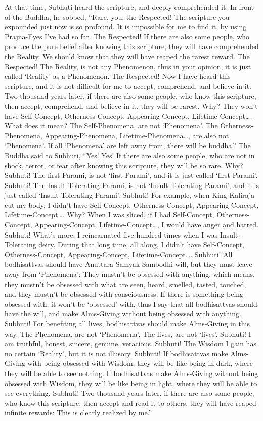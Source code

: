 \documentclass[a5paper,12pt]{book}
\begin{document}
     At that time, Subhuti heard the scripture, and deeply comprehended it. In front of the Buddha, he sobbed, ``Rare, you, the Respected! The scripture you expounded just now is so profound. It is impossible for me to find it, by using Prajna-Eyes I've had so far. The Respected! If there are also some people, who produce the pure belief after knowing this scripture, they will have comprehended the Reality. We should know that they will have reaped the rarest reward. The Respected! The Reality, is not any Phenomenon, thus in your opinion, it is just called `Reality' as a Phenomenon. The Respected! Now I have heard this scripture, and it is not difficult for me to accept, comprehend, and believe in it. Two thousand years later, if there are also some people, who know this scripture, then accept, comprehend, and believe in it, they will be rarest. Why? They won't have Self-Concept, Otherness-Concept, Appearing-Concept, Lifetime-Concept\dots{}. What does it mean? The Self-Phenomena, are not `Phenomena'. The Otherness-Phenomena, Appearing-Phenomena, Lifetime-Phenomena\dots{}, are also not `Phenomena'. If all `Phenomena' are left away from, there will be buddha.'' The Buddha said to Subhuti, ``Yes! Yes! If there are also some people, who are not in shock, terror, or fear after knowing this scripture, they will be so rare. Why? Subhuti! The first Parami, is not `first Parami', and it is just called `first Parami'. Subhuti! The Insult-Tolerating-Parami, is not `Insult-Tolerating-Parami', and it is just called `Insult-Tolerating-Parami'. Subhuti! For example, when King Kaliraja cut my body, I didn't have Self-Concept, Otherness-Concept, Appearing-Concept, Lifetime-Concept\dots{}. Why? When I was sliced, if I had Self-Concept, Otherness-Concept, Appearing-Concept, Lifetime-Concept\dots{}, I would have anger and hatred. Subhuti! What's more, I reincarnated five hundred times when I was Insult-Tolerating deity. During that long time, all along, I didn't have Self-Concept, Otherness-Concept, Appearing-Concept, Lifetime-Concept\dots{}. Subhuti! All bodhisattvas should have Anuttara-Samyak-Sambodhi will, but they must leave away from `Phenomena': They mustn't be obsessed with anything, which means, they mustn't be obsessed with what are seen, heard, smelled, tasted, touched, and they mustn't be obsessed with consciousness. If there is something being obsessed with, it won't be `obsessed' with, thus I say that all bodhisattvas should have the will, and make Alms-Giving without being obsessed with anything. Subhuti! For benefiting all lives, bodhisattvas should make Alms-Giving in this way. The Phenomena, are not `Phenomena'. The lives, are not `lives'. Subhuti! I am truthful, honest, sincere, genuine, veracious. Subhuti! The Wisdom I gain has no certain `Reality', but it is not illusory. Subhuti! If bodhisattvas make Alms-Giving with being obsessed with Wisdom, they will be like being in dark, where they will be able to see nothing. If bodhisattvas make Alms-Giving without being obsessed with Wisdom, they will be like being in light, where they will be able to see everything. Subhuti! Two thousand years later, if there are also some people, who know this scripture, then accept and read it to others, they will have reaped infinite rewards: This is clearly realized by me.''
\end{document}
